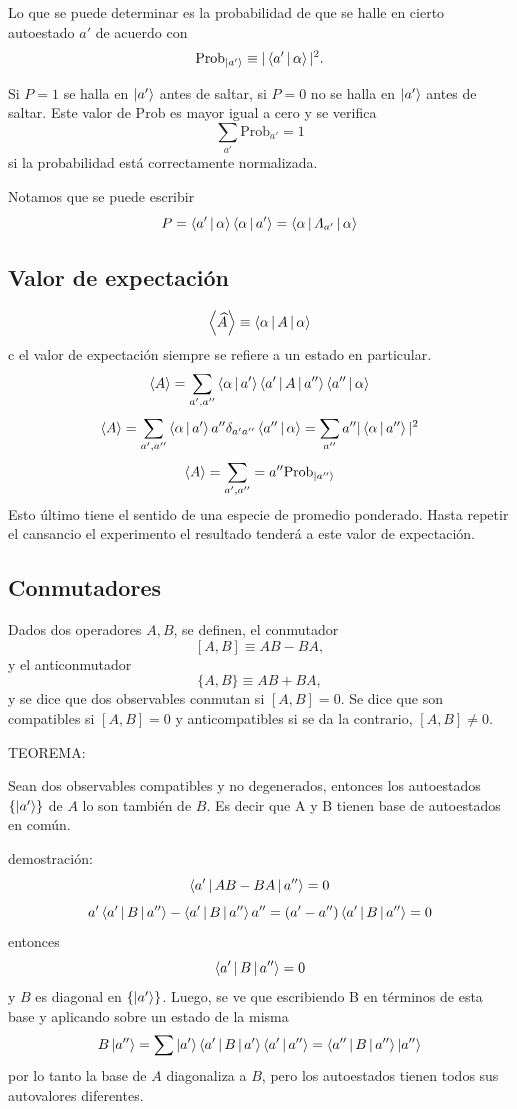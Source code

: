 \documentclass[10pt,oneside]{CBFT_book}
\begin{document}
Lo que se puede determinar es la probabilidad de que se halle en cierto autoestado
$a'$ de acuerdo con 
\[
	\mathrm{Prob}_{\Ket{a'}} \equiv |\Braket{a'|\alpha}|^2.
\]

Si $P=1$ se halla en $\Ket{a'}$ antes de saltar, si $P=0$ no se halla en $\Ket{a'}$ 
antes de saltar. Este valor de $\mathrm{Prob}$ es mayor igual a cero y se verifica
\[
	\sum_{a'} \mathrm{Prob}_{a'} = 1
\]
si la probabilidad está correctamente normalizada.


Notamos que se puede escribir
\[
	P = \Braket{a'|\alpha}\Braket{\alpha|a'} = \Braket{\alpha |\Lambda_{a'}| \alpha}
\]

\subsection{Valor de expectación}

\[
	\Braket{\widehat{A}} \equiv \Braket{\alpha|A|\alpha}
\]c
el valor de expectación siempre se refiere a un estado en particular.
\[
	\Braket{A} = \sum_{a',a''} \Braket{\alpha|a'}	\Braket{a'|A|a''} \Braket{a''|\alpha}
\]
\[
	\Braket{A} = \sum_{a',a''}  \Braket{\alpha|a'} a''\delta_{a'a''} \Braket{a''|\alpha} =
			\sum_{a''} a''|\Braket{\alpha|a''}|^2
\]
\[
	\Braket{A} = \sum_{a',a''} = a'' \text{Prob}_{\Ket{a''}}
\]
Esto último tiene el sentido de una especie de promedio ponderado.
Hasta repetir el cansancio el experimento el resultado tenderá a este valor de expectación.


\subsection{Conmutadores}

Dados dos operadores $A, B$, se definen, el conmutador
\[
	[ A, B] \equiv AB - BA,
\]
y el anticonmutador
\[
	\{ A, B \} \equiv AB + BA,
\]
y se dice que dos observables conmutan si $[A,B]=0$. Se dice que son compatibles si $[A,B]=0$
y anticompatibles si se da la contrario, $[A,B]\neq 0$.

TEOREMA:

Sean dos observables compatibles y no degenerados, entonces los autoestados $\{ \Ket{a'}\}$ de $A$ lo son también de 
$B$. Es decir que A y B tienen base de autoestados en común.

demostración:
\[
	\Braket{a'|AB-BA|a''} = 0 
\]
\[
	a' \Braket{a'|B|a''} - \Braket{a'|B|a''} a''= (a'-a'') \Braket{a'|B|a''}= 0 
\]
entonces 
\[
	\Braket{a'|B|a''} = 0
\]
y $B$ es diagonal en $\{ \Ket{a'}\}$.
Luego, se ve que escribiendo B en términos de esta base y aplicando sobre un estado de la misma
\[
	B \Ket{a''} = \sum \Ket{a'} \Braket{a'|B|a'} \Braket{a'|a''} = \Braket{a''|B|a''} \Ket{a''}
\]
por lo tanto la base de $A$ diagonaliza a $B$, pero los autoestados tienen todos sus autovalores diferentes.
\end{document}

